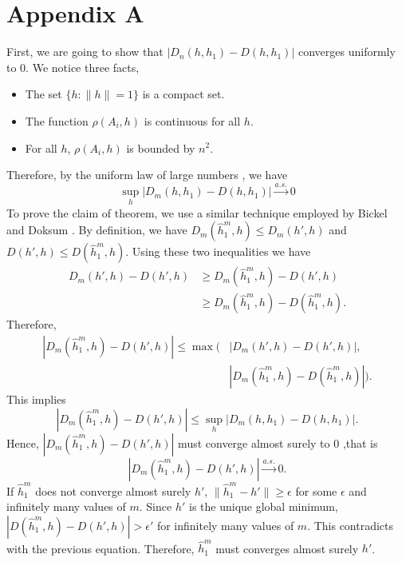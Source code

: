 \documentclass[10pt,journal,compsoc]{IEEEtran}
\newenvironment{proof}[1][Proof]{\begin{trivlist}
		\item[\hskip \labelsep {\bfseries #1}]}{\end{trivlist}}
\begin{document}
\section*{Appendix A}
\begin{proof} [Proof of Theorem 4.1]
First,  we are going to show that $|D_n(h,h_1)-D(h,h_1)|$ converges uniformly to $0$.
We notice three facts,
\begin{itemize}
	\item[(1)] The set $\{h: \|h\|=1\}$ is a compact set.
	\item[(2)] The function $\rho(A_i,h)$ is continuous for all $h$.
	\item[(3)] For all $h$, $\rho(A_i,h)$ is bounded by $n^2$.
\end{itemize}
Therefore, by the uniform law of large numbers \cite{jennrich1969asymptotic}, we have
\[\underset{h}{\sup}|D_m(h,h_1)-D(h,h_1)|\overset{a.s.}{\rightarrow} 0\]
To prove the claim of theorem, we use a similar technique employed by Bickel and Doksum \cite{bickel2015mathematical}. By definition, we have $D_m(\hat{h}_1^m,h)  \leq D_m(h',h)$ and $D(h',h) \leq D(\hat{h}_1^m,h)$. Using these two inequalities we have
\begin{align*}
D_m(h',h)-D(h',h) &\geq D_m(\hat{h}_1^m,h)-D(h',h) \\
&\geq D_m(\hat{h}_1^m,h)-D(\hat{h}_1^m,h) .
\end{align*}
Therefore, 
\begin{align*}
|D_m(\hat{h}_1^m,h)-D(h',h)|  \leq  \max(&|D_m(h',h)-D(h',h)|,\\
& |D_m(\hat{h}_1^m,h)-D(\hat{h}_1^m,h)|).
\end{align*}
This implies 
\[ |D_m(\hat{h}_1^m,h)-D(h',h)| \leq \underset{h}{\sup}|D_m(h,h_1)-D(h,h_1)|. \]
Hence, $|D_m(\hat{h}_1^m,h)-D(h',h)|$ must converge almost surely to $0$ ,that is
\[|D_m(\hat{h}_1^m,h)-D(h',h)|\overset{a.s.}{\rightarrow} 0 .\]
 If $\hat{h}_1^m$ does not converge almost surely $h'$, $\|\hat{h}_1^m-h'\|\geq \epsilon$ for some $\epsilon$ and infinitely many values of $m$. Since $h'$ is the unique global minimum, $|D(\hat{h}_1^m,h)-D(h',h)| > \epsilon' $ for infinitely many values of $m$. This contradicts with the previous equation. Therefore, $\hat{h}_1^m$ must converges almost surely $h'$.
	
\end{proof}
\end{document}
